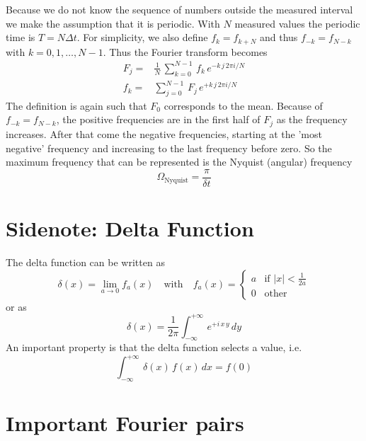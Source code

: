 Because we do not know the sequence of numbers outside the measured interval we make the assumption that it is periodic. With $N$ measured values the periodic time is $T = N \Delta t$. For simplicity, we also define $f_k = f_{k + N}$ and thus $f_{-k} = f_{N - k}$ with $k= 0, 1, \dots, N-1$. Thus the Fourier transform becomes
\begin{align}
 F_j = & \frac{1}{N} \, \sum_{k=0}^{N-1} \, f_k \, e^{- k \, j \, 2 \pi i / N } \\
  f_k = & \sum_{j=0}^{N-1} \, F_j \, e^{+ k \, j \, 2 \pi i / N } 
\end{align}
The definition is again such that $F_0$ corresponds to the mean. Because of $f_{-k} = f_{N - k}$, the positive frequencies are in the first half of $F_j$ as the frequency increases. After that come the negative frequencies, starting at the 'most negative' frequency and increasing to the last frequency before zero. So the maximum frequency that can be represented is the Nyquist (angular) frequency
\begin{equation}
\Omega_\text{Nyquist} = \frac{\pi}{\delta t}
\end{equation}



\section{Sidenote: Delta Function}

The delta function can be written as
\begin{equation}
  \delta(x) = \lim_{a \rightarrow 0} f_a(x) \quad
   \text{with} \quad
    f_a(x) = \left\{ \begin{matrix}
    a & \text{if } |x| < \frac{1}{2a} \\
    0 & \text{other}
    \end{matrix}
    \right.
\end{equation}
or as
\begin{equation}
\delta(x) = \frac{1}{2 \pi}  \int_{-\infty}^{+\infty} \, e^{+ i\, x \, y} \, dy
\end{equation}
An important property is that the delta function selects a value, i.e. 
\begin{equation}
 \int_{-\infty}^{+\infty} \, \delta(x) \, f(x) \, dx = f(0)
\end{equation}


\section{Important Fourier pairs}

